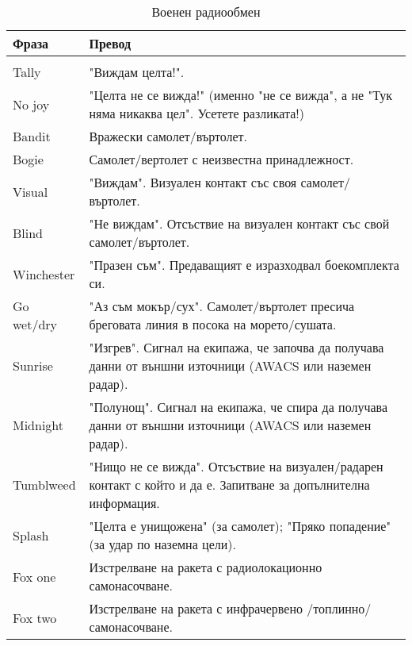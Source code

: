 \begin{longtable}
{|p{}|p{}|}
\hline
\textbf{Фраза} & \textbf{Превод} \\
\hline
\endhead
\hline
\endfoot
\hline
\caption{Военен радиообмен} \label{tab:callouts} \\
\endlastfoot
\hline

Tally & "Виждам целта!".\\
No joy & "Целта не се вижда!" (именно "не се вижда", а не "Тук няма никаква цел". Усетете разликата!)\\

Bandit & Вражески самолет/въртолет.\\

Bogie & Самолет/вертолет с неизвестна принадлежност.\\

Visual & "Виждам". Визуален контакт със своя самолет/въртолет.\\

Blind & "Не виждам". Отсъствие на визуален контакт със свой самолет/въртолет.\\

Winchester & "Празен съм". Предаващият е изразходвал боекомплекта си.\\

Go wet/dry & "Аз съм мокър/сух". Самолет/въртолет пресича бреговата линия в посока на морето/сушата.\\

Sunrise & "Изгрев". Сигнал на екипажа, че започва да получава данни от външни източници (AWACS или наземен радар).\\

Midnight & "Полунощ". Сигнал на екипажа, че спира да получава данни от външни източници (AWACS или наземен радар).\\

Tumblweed & "Нищо не се вижда". Отсъствие на визуален/радарен контакт с който и да е. Запитване за допълнителна информация.\\

Splash & "Целта е унищожена" (за самолет); "Пряко попадение" (за удар по наземна цели).\\

Fox one & Изстрелване на ракета с радиолокационно самонасочване.\\

Fox two & Изстрелване на ракета с инфрачервено /топлинно/ самонасочване.\\


\end{longtable}

